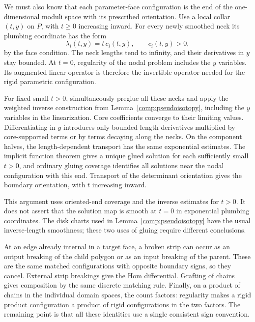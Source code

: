 \documentclass[11pt]{article}
\numberwithin{equation}{section}
\theoremstyle{definition}
\theoremstyle{remark}
\begin{document}
We must also know that each parameter-face configuration is the
end of the one-dimensional moduli space with its prescribed
orientation.  Use a local collar $(t,y)$ on $P$, with $t\geq0$
increasing inward.  For every newly smoothed neck its plumbing
coordinate has the form
\begin{equation}
 \lambda_i(t,y)=t\,c_i(t,y),\qquad c_i(t,y)>0,
 \label{comp:simultaneous-plumbing}
\end{equation}
by the face condition.  The neck lengths tend to infinity, and
their derivatives in $y$ stay bounded.  At $t=0$, regularity of
the nodal problem includes the $y$ variables.  Its augmented
linear operator is therefore the invertible operator needed for
the rigid parametric configuration.

For fixed small $t>0$, simultaneously preglue all these necks and
apply the weighted inverse construction from
Lemma~\ref{comp:pseudoisotopy}, including the $y$ variables in the
linearization.  Core coefficients converge to their limiting
values.  Differentiating in $y$ introduces only bounded
length derivatives multiplied by core-supported terms or by
terms decaying along the necks.  On the component halves, the
length-dependent transport has the same exponential estimates.
The implicit function theorem gives a unique glued solution for
each sufficiently small $t>0$, and ordinary gluing coverage
identifies all solutions near the nodal configuration with this
end.  Transport of the determinant orientation gives the boundary
orientation, with $t$ increasing inward.

This argument uses oriented-end coverage and the inverse estimates
for $t>0$.  It does not assert that the solution map is smooth at
$t=0$ in exponential plumbing coordinates.  The disk charts used
in Lemma~\ref{comp:pseudoisotopy} have the usual inverse-length
smoothness; these two uses of gluing require different conclusions.

At an edge already internal in a target face, a broken strip can
occur as an output breaking of the child polygon or as an input
breaking of the parent.  These are the same matched
configurations with opposite boundary signs, so they cancel.
External strip breakings give the Hom differential.  Grafting of
chains gives composition by the same discrete matching rule.
Finally, on a product of chains in the individual domain spaces,
the count factors: regularity makes a rigid product configuration
a product of rigid configurations in the two factors.  The
remaining point is that all these identities use a single
consistent sign convention.
\end{document}
